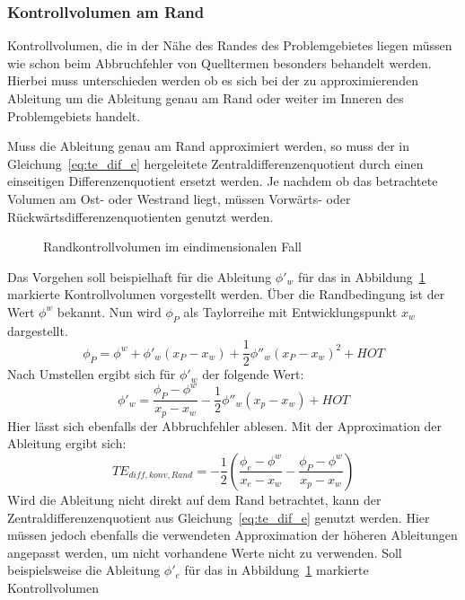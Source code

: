 \subsubsection{Kontrollvolumen am Rand}

Kontrollvolumen, die in der Nähe des Randes des Problemgebietes liegen müssen wie schon beim
Abbruchfehler von Quelltermen besonders behandelt werden. Hierbei muss unterschieden werden ob es sich
bei der zu approximierenden Ableitung um die Ableitung genau am Rand oder weiter im Inneren des
Problemgebiets handelt.

Muss die Ableitung genau am Rand approximiert werden, so muss der in Gleichung~\ref{eq:te_dif_e} hergeleitete
Zentraldifferenzenquotient durch einen einseitigen Differenzenquotient ersetzt werden. Je nachdem ob das
betrachtete Volumen am Ost- oder Westrand liegt, müssen Vorwärts- oder Rückwärtsdifferenzenquotienten genutzt werden.
\begin{figure}[hb]

\centering
\caption{Randkontrollvolumen im eindimensionalen Fall}
\label{fig:kv1d_rand}
\end{figure}
Das Vorgehen soll beispielhaft für die Ableitung $\phi'_w$ für das in Abbildung~\ref{fig:kv1d_rand} markierte Kontrollvolumen
vorgestellt werden.
Über die Randbedingung ist der Wert $\phi^w$ bekannt. Nun wird $\phi_P$ als Taylorreihe mit Entwicklungspunkt
$x_w$ dargestellt.
\begin{equation*}
  \phi_P = \phi^w + \phi'_w (x_P-x_w) + \frac{1}{2} \phi''_w (x_P-x_w)^2 + HOT
\end{equation*}
Nach Umstellen ergibt sich für $\phi'_w$ der folgende Wert:
\begin{equation}
  \phi'_w = \frac{\phi_P-\phi^w}{x_p-x_w} -\frac{1}{2} \phi''_w(x_p-x_w) + HOT
\end{equation}
Hier lässt sich ebenfalls der Abbruchfehler ablesen. Mit der Approximation der Ableitung
ergibt sich:
\begin{equation}
  TE_{diff, konv, Rand} = -\frac{1}{2} \left({\frac{\phi_e-\phi^w}{x_e-x_w}-
  \frac{\phi_P-\phi^w}{x_p-x_w} }\right)
\end{equation}
Wird die Ableitung nicht direkt auf dem Rand betrachtet, kann der Zentraldifferenzenquotient
aus Gleichung~\ref{eq:te_dif_e} genutzt werden. Hier müssen jedoch ebenfalls die verwendeten
Approximation der höheren Ableitungen angepasst werden, um nicht vorhandene Werte nicht zu verwenden.
Soll beispielsweise die Ableitung $\phi'_e$ für das in Abbildung~\ref{fig:kv1d_rand} markierte Kontrollvolumen
